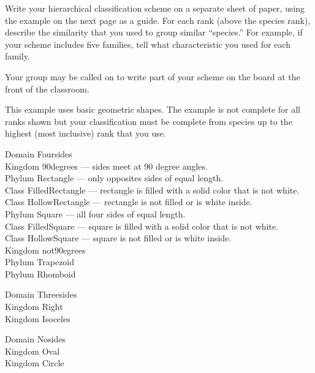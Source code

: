 \documentclass[12pt]{exam}
\newlength{\myindent}
\newcommand{\ind}{\hspace*{\myindent}}
\begin{document}
\begin{questions}

\question
Write your hierarchical classification scheme on a separate sheet of paper, using the example on the next page as a guide. For each rank (above the species rank), describe the similarity that you used to group similar “species.” For example, if your scheme includes five families, tell what characteristic you used for each family.


Your group may be called on to write part of your scheme on the board at the front of the classroom.

\end{questions}

\newpage

This example uses basic geometric shapes. The example is not complete for all ranks shown but your classification must be complete from species up to the highest (most inclusive) rank that you use. \bigskip

Domain Foursides\\
	\ind Kingdom 90degrees — sides meet at 90 degree angles.\\
	\ind	\ind Phylum Rectangle — only opposites sides of equal length.\\
	\ind	\ind	\ind Class FilledRectangle — rectangle is filled with a solid color that is not white.\\
	\ind	\ind	\ind Class HollowRectangle  — rectangle is not filled or is white inside. \\
	\ind	\ind Phylum Square — all four sides of equal length.\\
	\ind	\ind	\ind Class FilledSquare — square is filled with a solid color that is not white.\\ 
	\ind	\ind	\ind Class HollowSquare — square is not filled or is white inside. \\
	\ind Kingdom not90egrees\\
	\ind	\ind Phylum Trapezoid\\
	\ind	\ind Phylum Rhomboid
	
	\medskip
	
Domain Threesides\\
	\ind Kingdom Right\\
	\ind Kingdom Isoceles
	
	\medskip
	
Domain Nosides\\
	\ind Kingdom Oval\\
	\ind Kingdom Circle\\
\end{document}
